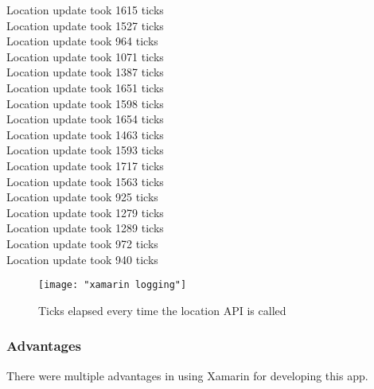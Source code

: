 \documentclass[12pt,a4paper]{article}
\begin{document}
{    Location update took 1615 ticks\\
    Location update took 1527 ticks\\
    Location update took 964 ticks\\
    Location update took 1071 ticks\\
    Location update took 1387 ticks\\
    Location update took 1651 ticks\\
    Location update took 1598 ticks\\
    Location update took 1654 ticks\\
    Location update took 1463 ticks\\
    Location update took 1593 ticks\\
    Location update took 1717 ticks\\
    Location update took 1563 ticks\\
    Location update took 925 ticks\\
    Location update took 1279 ticks\\
    Location update took 1289 ticks\\
    Location update took 972 ticks\\
    Location update took 940 ticks
    }
	
	\begin{figure}
	    \centering
	    \texttt{[image: "xamarin logging"]}
	    \caption{Ticks elapsed every time the location API is called}
	\end{figure}
	
	\subsubsection{Advantages}
	
	There were multiple advantages in using Xamarin for developing this app.
	
\end{document}
